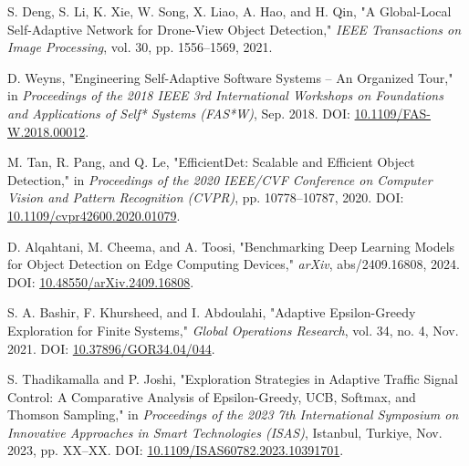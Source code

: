 \begin{thebibliography}{00}
S. Deng, S. Li, K. Xie, W. Song, X. Liao, A. Hao, and H. Qin,
"A Global-Local Self-Adaptive Network for Drone-View Object Detection,"
\textit{IEEE Transactions on Image Processing}, vol. 30, pp. 1556--1569, 2021.

D. Weyns,
"Engineering Self-Adaptive Software Systems – An Organized Tour,"
in \textit{Proceedings of the 2018 IEEE 3rd International Workshops on Foundations and Applications of Self* Systems (FAS*W)}, Sep. 2018.
DOI: \href{https://doi.org/10.1109/FAS-W.2018.00012}{10.1109/FAS-W.2018.00012}.

M. Tan, R. Pang, and Q. Le,
"EfficientDet: Scalable and Efficient Object Detection,"
in \textit{Proceedings of the 2020 IEEE/CVF Conference on Computer Vision and Pattern Recognition (CVPR)}, pp. 10778--10787, 2020.
DOI: \href{https://doi.org/10.1109/cvpr42600.2020.01079}{10.1109/cvpr42600.2020.01079}.

D. Alqahtani, M. Cheema, and A. Toosi,
"Benchmarking Deep Learning Models for Object Detection on Edge Computing Devices,"
\textit{arXiv}, abs/2409.16808, 2024.
DOI: \href{https://doi.org/10.48550/arXiv.2409.16808}{10.48550/arXiv.2409.16808}.

S. A. Bashir, F. Khursheed, and I. Abdoulahi,
"Adaptive Epsilon-Greedy Exploration for Finite Systems,"
\textit{Global Operations Research}, vol. 34, no. 4, Nov. 2021.
DOI: \href{https://doi.org/10.37896/GOR34.04/044}{10.37896/GOR34.04/044}.

S. Thadikamalla and P. Joshi,
"Exploration Strategies in Adaptive Traffic Signal Control: A Comparative Analysis of Epsilon-Greedy, UCB, Softmax, and Thomson Sampling,"
in \textit{Proceedings of the 2023 7th International Symposium on Innovative Approaches in Smart Technologies (ISAS)}, Istanbul, Turkiye, Nov. 2023, pp. XX--XX. 
DOI: \href{https://doi.org/10.1109/ISAS60782.2023.10391701}{10.1109/ISAS60782.2023.10391701}.

\end{thebibliography}
